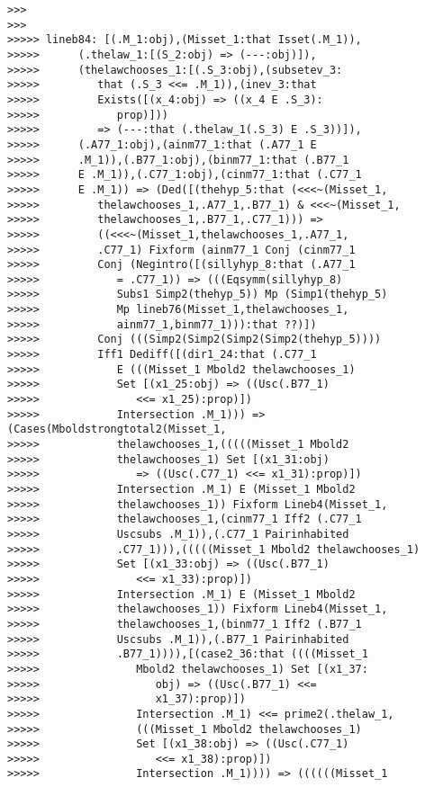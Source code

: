 \documentclass[12pt]{article}
\begin{document}
\begin{verbatim}
>>>
>>>
>>>>> lineb84: [(.M_1:obj),(Misset_1:that Isset(.M_1)),
>>>>>      (.thelaw_1:[(S_2:obj) => (---:obj)]),
>>>>>      (thelawchooses_1:[(.S_3:obj),(subsetev_3:
>>>>>         that (.S_3 <<= .M_1)),(inev_3:that
>>>>>         Exists([(x_4:obj) => ((x_4 E .S_3):
>>>>>            prop)]))
>>>>>         => (---:that (.thelaw_1(.S_3) E .S_3))]),
>>>>>      (.A77_1:obj),(ainm77_1:that (.A77_1 E
>>>>>      .M_1)),(.B77_1:obj),(binm77_1:that (.B77_1
>>>>>      E .M_1)),(.C77_1:obj),(cinm77_1:that (.C77_1
>>>>>      E .M_1)) => (Ded([(thehyp_5:that (<<<~(Misset_1,
>>>>>         thelawchooses_1,.A77_1,.B77_1) & <<<~(Misset_1,
>>>>>         thelawchooses_1,.B77_1,.C77_1))) =>
>>>>>         ((<<<~(Misset_1,thelawchooses_1,.A77_1,
>>>>>         .C77_1) Fixform (ainm77_1 Conj (cinm77_1
>>>>>         Conj (Negintro([(sillyhyp_8:that (.A77_1
>>>>>            = .C77_1)) => (((Eqsymm(sillyhyp_8)
>>>>>            Subs1 Simp2(thehyp_5)) Mp (Simp1(thehyp_5)
>>>>>            Mp lineb76(Misset_1,thelawchooses_1,
>>>>>            ainm77_1,binm77_1))):that ??)])
>>>>>         Conj (((Simp2(Simp2(Simp2(Simp2(thehyp_5))))
>>>>>         Iff1 Dediff([(dir1_24:that (.C77_1
>>>>>            E (((Misset_1 Mbold2 thelawchooses_1)
>>>>>            Set [(x1_25:obj) => ((Usc(.B77_1)
>>>>>               <<= x1_25):prop)])
>>>>>            Intersection .M_1))) => (Cases(Mboldstrongtotal2(Misset_1,
>>>>>            thelawchooses_1,(((((Misset_1 Mbold2
>>>>>            thelawchooses_1) Set [(x1_31:obj)
>>>>>               => ((Usc(.C77_1) <<= x1_31):prop)])
>>>>>            Intersection .M_1) E (Misset_1 Mbold2
>>>>>            thelawchooses_1)) Fixform Lineb4(Misset_1,
>>>>>            thelawchooses_1,(cinm77_1 Iff2 (.C77_1
>>>>>            Uscsubs .M_1)),(.C77_1 Pairinhabited
>>>>>            .C77_1))),(((((Misset_1 Mbold2 thelawchooses_1)
>>>>>            Set [(x1_33:obj) => ((Usc(.B77_1)
>>>>>               <<= x1_33):prop)])
>>>>>            Intersection .M_1) E (Misset_1 Mbold2
>>>>>            thelawchooses_1)) Fixform Lineb4(Misset_1,
>>>>>            thelawchooses_1,(binm77_1 Iff2 (.B77_1
>>>>>            Uscsubs .M_1)),(.B77_1 Pairinhabited
>>>>>            .B77_1)))),[(case2_36:that ((((Misset_1
>>>>>               Mbold2 thelawchooses_1) Set [(x1_37:
>>>>>                  obj) => ((Usc(.B77_1) <<=
>>>>>                  x1_37):prop)])
>>>>>               Intersection .M_1) <<= prime2(.thelaw_1,
>>>>>               (((Misset_1 Mbold2 thelawchooses_1)
>>>>>               Set [(x1_38:obj) => ((Usc(.C77_1)
>>>>>                  <<= x1_38):prop)])
>>>>>               Intersection .M_1)))) => ((((((Misset_1

\end{verbatim}
\end{document}
